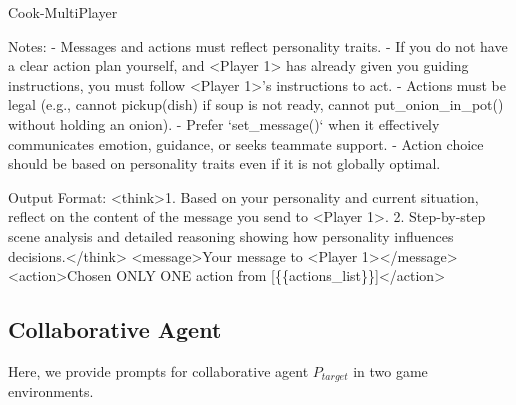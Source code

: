 \documentclass{article}
\theoremstyle{plain}
\theoremstyle{definition}
\theoremstyle{remark}
\begin{document}
\begin{myexample}{Cook-MultiPlayer}
\leavevmode\par
Notes:
- Messages and actions must reflect personality traits.
- If you do not have a clear action plan yourself, and <Player 1> has already given you guiding instructions, you must follow <Player 1>'s instructions to act.
- Actions must be legal (e.g., cannot pickup(dish) if soup is not ready, cannot put\_onion\_in\_pot() without holding an onion).
- Prefer `set\_message()` when it effectively communicates emotion, guidance, or seeks teammate support.
- Action choice should be based on personality traits even if it is not globally optimal.
\leavevmode\par
Output Format:
<think>1. Based on your personality and current situation, reflect on the content of the message you send to <Player 1>. 2. Step-by-step scene analysis and detailed reasoning showing how personality influences decisions.</think>
<message>Your message to <Player 1></message>
<action>Chosen ONLY ONE action from [\{\{actions\_list\}\}]</action>
\end{myexample}

\subsection{Collaborative Agent}\label{apx:prompt_agent}
Here, we provide prompts for collaborative agent $P_{target}$ in two game environments.
\end{document}
